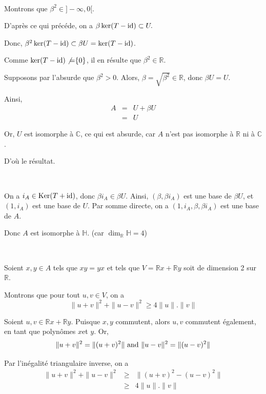 \

 Montrons que $\beta^2 \in] - \infty, 0 [$.

D'apr{\`e}s ce qui pr{\'e}c{\'e}de, on a $\beta \ker (T - \operatorname{id}) \subset
U.$

Donc, $\beta^2 \ker (T - \operatorname{id}) \subset \beta U = \ker (T - \operatorname{id})$.

Comme $\ker (T - \operatorname{id}) \not{=} \{ 0 \}$, il en r{\'e}sulte que $\beta^2
\in \mathbb{R}$.

Supposons par l'absurde que $\beta^2 > 0$. Alors, $\beta = \sqrt{\beta^2} \in
\mathbb{R}$, donc $\beta U = U$.

Ainsi,
\begin{eqnarray*}
  A & = & U + \beta U\\
  & = & U
\end{eqnarray*}


Or, $U$ est isomorphe {\`a} $\mathbb{C}$, ce qui est absurde, car $A$ n'est
pas isomorphe {\`a} $\mathbb{R}$ ni {\`a} $\mathbb{C}$.

D'o{\`u} le r{\'e}sultat.

\

 On a $i_A \in \operatorname{Ker} (T + \operatorname{id})$, donc $\beta i_A
\in \beta U$. Ainsi, $(\beta, \beta  i_A)$ est une base de $\beta U$, et $(1,
i_A)$ est une base de $U$. Par somme directe, on a $(1, i_A, \beta, \beta
i_A)$ est une base de $A$.

Donc $A$ est isomorphe {\`a} $\mathbb{H}$. (car $\dim_{\mathbb{R}} \mathbb{H}=
4$)

\

 Soient $x, y \in A$ tels que $x y = y x$ et tels que $V
=\mathbb{R}x +\mathbb{R}y$ soit de dimension 2 sur $\mathbb{R}$.

Montrons que pour tout $u, v \in V$, on a
\[ \| u + v \|^2 + \| u - v \|^2 \geqslant 4 \| u \| . \| v \| \]


Soient $u, v \in \mathbb{R}x +\mathbb{R}y$. Puisque $x, y$ commutent, alors
$u, v$ commutent {\'e}galement, en tant que polyn{\^o}mes $x$et $y$. Or,
\[ \| u + v \|^2 = \| (u + v)^2 \| \text{ and } \| u - v \|^2 = \| (u - v)^2 \|
\]


Par l'in{\'e}galit{\'e} triangulaire inverse, on a
\begin{eqnarray*}
  \| u + v \|^2 + \| u - v \|^2 & \geqslant & \| (u + v)^2 - (u - v)^2 \|\\
  & \geqslant & 4 \| u \| . \| v \|
\end{eqnarray*}


